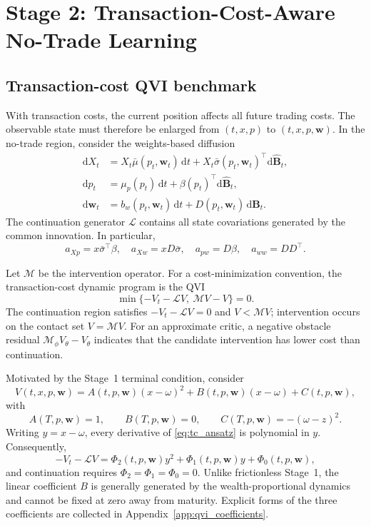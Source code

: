 \documentclass[a4paper,10pt]{article}
\newcommand{\dd}{\mathrm{d}}
\newcommand{\bw}{\bm{w}}
\newcommand{\bBh}{\widehat{\bm{B}}}
\begin{document}
\section{Stage 2: Transaction-Cost-Aware No-Trade Learning}

\subsection{Transaction-cost QVI benchmark}

With transaction costs, the current position affects all future trading costs. The observable state must therefore be enlarged from $(t,x,p)$ to $(t,x,p,\bw)$. In the no-trade region, consider the weights-based diffusion
\begin{align}
\dd X_t&=X_t\bar\mu(p_t,\bw_t)\,\dd t
+X_t\bar\sigma(p_t,\bw_t)^\top\dd\bBh_t,\\
\dd p_t&=\mu_p(p_t)\,\dd t+\beta(p_t)^\top\dd\bBh_t,\\
\dd\bw_t&=b_w(p_t,\bw_t)\,\dd t+D(p_t,\bw_t)\,\dd\bBh_t.
\label{eq:no_trade_dynamics}
\end{align}
The continuation generator $\mathcal L$ contains all state covariations generated by the common innovation. In particular,
\begin{equation}
a_{Xp}=x\bar\sigma^\top\beta,\quad
a_{Xw}=xD\bar\sigma,\quad
a_{pw}=D\beta,\quad
a_{ww}=DD^\top.
\end{equation}

Let $\mathcal M$ be the intervention operator. For a cost-minimization convention, the transaction-cost dynamic program is the QVI
\begin{equation}
\min\{-V_t-\mathcal LV,\ \mathcal MV-V\}=0.
\label{eq:tc_qvi}
\end{equation}
The continuation region satisfies $-V_t-\mathcal LV=0$ and $V<\mathcal MV$; intervention occurs on the contact set $V=\mathcal MV$. For an approximate critic, a negative obstacle residual $\mathcal M_\phi V_\theta-V_\theta$ indicates that the candidate intervention has lower cost than continuation.

Motivated by the Stage~1 terminal condition, consider
\begin{equation}
V(t,x,p,\bw)
=A(t,p,\bw)(x-\omega)^2
+B(t,p,\bw)(x-\omega)
+C(t,p,\bw),
\label{eq:tc_ansatz}
\end{equation}
with
\begin{equation}
A(T,p,\bw)=1,\qquad B(T,p,\bw)=0,\qquad
C(T,p,\bw)=-(\omega-z)^2.
\end{equation}
Writing $y=x-\omega$, every derivative of \eqref{eq:tc_ansatz} is polynomial in $y$. Consequently,
\begin{equation}
-V_t-\mathcal LV
=\Phi_2(t,p,\bw)y^2+\Phi_1(t,p,\bw)y+\Phi_0(t,p,\bw),
\label{eq:phi_decomposition}
\end{equation}
and continuation requires $\Phi_2=\Phi_1=\Phi_0=0$. Unlike frictionless Stage~1, the linear coefficient $B$ is generally generated by the wealth-proportional dynamics and cannot be fixed at zero away from maturity. Explicit forms of the three coefficients are collected in Appendix~\ref{app:qvi_coefficients}.
\end{document}
